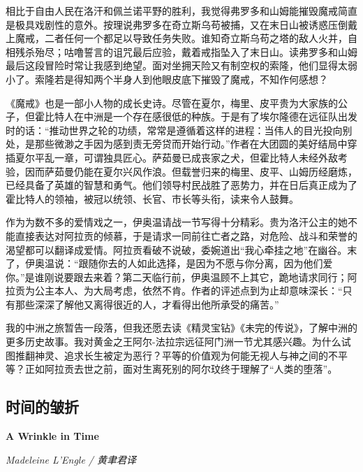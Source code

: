 \par 相比于自由人民在洛汗和佩兰诺平野的胜利，我觉得弗罗多和山姆能摧毁魔戒简直是极具戏剧性的意外。按理说弗罗多在奇立斯乌苟被捕，又在末日山被诱惑压倒戴上魔戒，二者任何一个都足以导致任务失败。谁知奇立斯乌苟之塔的敌人火并，自相残杀殆尽；咕噜誓言的诅咒最后应验，戴着戒指坠入了末日山。读弗罗多和山姆最后这段冒险时常让我感到绝望。面对坐拥天险又有制空权的索隆，他们显得太弱小了。索隆若是得知两个半身人到他眼皮底下摧毁了魔戒，不知作何感想？
\par 《魔戒》也是一部小人物的成长史诗。尽管在夏尔，梅里、皮平贵为大家族的公子，但霍比特人在中洲是一个存在感很低的种族。于是有了埃尔隆德在远征队出发时的话：“推动世界之轮的功绩，常常是遵循着这样的进程：当伟人的目光投向别处，是那些微渺之手因为感到责无旁贷而开始行动。”作者在大团圆的美好结局中穿插夏尔平乱一章，可谓独具匠心。萨茹曼已成丧家之犬，但霍比特人未经外敌考验，因而萨茹曼仍能在夏尔兴风作浪。但载誉归来的梅里、皮平、山姆历经磨炼，已经具备了英雄的智慧和勇气。他们领导村民战胜了恶势力，并在日后真正成为了霍比特人的领袖，被冠以统领、长官、市长等头衔，读来令人鼓舞。
\par 作为为数不多的爱情戏之一，伊奥温请战一节写得十分精彩。贵为洛汗公主的她不能直接表达对阿拉贡的倾慕，于是请求一同前往亡者之路，对危险、战斗和荣誉的渴望都可以翻译成爱情。阿拉贡看破不说破，委婉道出“我心牵挂之地”在幽谷。末了，伊奥温说：“跟随你去的人如此选择，是因为不愿与你分离，因为他们爱你。”是谁刚说要跟去来着？第二天临行前，伊奥温顾不上其它，跪地请求同行；阿拉贡为公主本人、为大局考虑，依然不肯。作者的评述点到为止却意味深长：“只有那些深深了解他又离得很近的人，才看得出他所承受的痛苦。”
\par 我的中洲之旅暂告一段落，但我还愿去读《精灵宝钻》《未完的传说》，了解中洲的更多历史故事。我对黄金之王阿尔-法拉宗远征阿门洲一节尤其感兴趣。为什么试图推翻神灵、追求长生被定为恶行？平等的价值观为何能无视人与神之间的不平等？正如阿拉贡去世之前，面对生离死别的阿尔玟终于理解了“人类的堕落”。
\par {}




\subsection*{时间的皱折}
\par \textbf{A Wrinkle in Time}
\par \emph{Madeleine L’Engle / 黄聿君译} 

